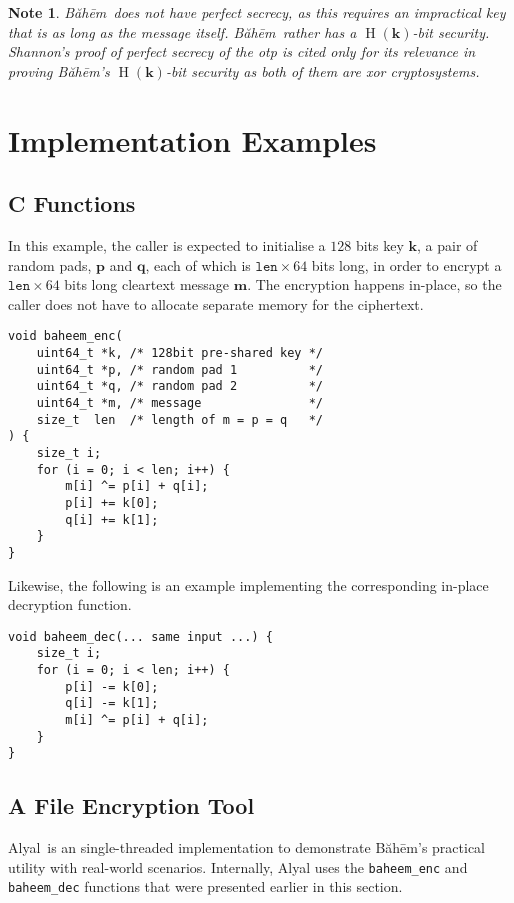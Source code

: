 \documentclass[twocolumn,hidelinks]{article}
\newcommand{\baheem}{Băhēm}
\newcommand{\alyal}{Alyal}
\DeclareMathOperator{\entropy}{H}
\newtheorem{note}{Note}
\begin{document}
\begin{note}
    \baheem\ does not have perfect secrecy, as this requires an impractical
    key that is as long as the message itself.  \baheem\ rather has a
    $\entropy(\mathbf{k})$-bit security.  Shannon's proof of perfect
    secrecy of the \gls{otp} is cited only for its relevance in proving
    \baheem's $\entropy(\mathbf{k})$-bit security as both of them are
    \gls{xor} cryptosystems.
\end{note}


\section{Implementation Examples}
\subsection{C Functions}
In this example, the caller is expected to initialise a $128$ bits key
$\mathbf{k}$, a pair of random pads, $\mathbf{p}$ and $\mathbf{q}$, each of
which is $\mathtt{len} \times 64$ bits long, in order to encrypt a
$\mathtt{len} \times 64$ bits long cleartext message $\mathbf{m}$.  The
encryption happens in-place, so the caller does not have to allocate
separate memory for the ciphertext.
\begin{verbatim}
void baheem_enc(
    uint64_t *k, /* 128bit pre-shared key */
    uint64_t *p, /* random pad 1          */
    uint64_t *q, /* random pad 2          */
    uint64_t *m, /* message               */
    size_t  len  /* length of m = p = q   */
) {
    size_t i;
    for (i = 0; i < len; i++) {
        m[i] ^= p[i] + q[i];
        p[i] += k[0];
        q[i] += k[1];
    }
}
\end{verbatim}
Likewise, the following is an example implementing the corresponding
in-place decryption function.
\begin{verbatim}
void baheem_dec(... same input ...) {
    size_t i;
    for (i = 0; i < len; i++) {
        p[i] -= k[0];
        q[i] -= k[1];
        m[i] ^= p[i] + q[i];
    }
}
\end{verbatim}


\subsection{A File Encryption Tool}
\alyal\ is an single-threaded implementation to demonstrate \baheem's
practical utility with real-world scenarios.  Internally, Alyal uses the
\texttt{baheem\_enc} and \texttt{baheem\_dec} functions that were presented
earlier in this section.
\end{document}
